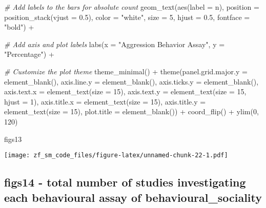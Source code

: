 \documentclass[
]{article}
\newenvironment{Shaded}{\begin{snugshade}}{\end{snugshade}}
\newcommand{\AttributeTok}[1]{\textcolor[rgb]{0.77,0.63,0.00}{#1}}
\newcommand{\CommentTok}[1]{\textcolor[rgb]{0.56,0.35,0.01}{\textit{#1}}}
\newcommand{\DecValTok}[1]{\textcolor[rgb]{0.00,0.00,0.81}{#1}}
\newcommand{\FloatTok}[1]{\textcolor[rgb]{0.00,0.00,0.81}{#1}}
\newcommand{\FunctionTok}[1]{\textcolor[rgb]{0.00,0.00,0.00}{#1}}
\newcommand{\NormalTok}[1]{#1}
\newcommand{\SpecialCharTok}[1]{\textcolor[rgb]{0.00,0.00,0.00}{#1}}
\newcommand{\StringTok}[1]{\textcolor[rgb]{0.31,0.60,0.02}{#1}}
\begin{document}
\begin{Shaded}
\begin{Highlighting}[]
  \CommentTok{\# Add labels to the bars for absolute count  }
  \FunctionTok{geom\_text}\NormalTok{(}\FunctionTok{aes}\NormalTok{(}\AttributeTok{label =}\NormalTok{ n), }\AttributeTok{position =} \FunctionTok{position\_stack}\NormalTok{(}\AttributeTok{vjust =} \FloatTok{0.5}\NormalTok{), }\AttributeTok{color =} \StringTok{"white"}\NormalTok{, }\AttributeTok{size =} \DecValTok{5}\NormalTok{, }\AttributeTok{hjust =} \FloatTok{0.5}\NormalTok{, }\AttributeTok{fontface =}   \StringTok{"bold"}\NormalTok{) }\SpecialCharTok{+}
  
  \CommentTok{\# Add axis and plot labels}
  \FunctionTok{labs}\NormalTok{(}\AttributeTok{x =} \StringTok{"Aggression Behavior Assay"}\NormalTok{, }\AttributeTok{y =} \StringTok{"Percentage"}\NormalTok{) }\SpecialCharTok{+}
  
  \CommentTok{\# Customize the plot theme}
  \FunctionTok{theme\_minimal}\NormalTok{() }\SpecialCharTok{+}
  \FunctionTok{theme}\NormalTok{(}\AttributeTok{panel.grid.major.y =} \FunctionTok{element\_blank}\NormalTok{(),}
    \AttributeTok{axis.line.y =} \FunctionTok{element\_blank}\NormalTok{(),}
    \AttributeTok{axis.ticks.y =} \FunctionTok{element\_blank}\NormalTok{(),}
    \AttributeTok{axis.text.x =} \FunctionTok{element\_text}\NormalTok{(}\AttributeTok{size =} \DecValTok{15}\NormalTok{),}
    \AttributeTok{axis.text.y =} \FunctionTok{element\_text}\NormalTok{(}\AttributeTok{size =} \DecValTok{15}\NormalTok{, }\AttributeTok{hjust =} \DecValTok{1}\NormalTok{),}
    \AttributeTok{axis.title.x =} \FunctionTok{element\_text}\NormalTok{(}\AttributeTok{size =} \DecValTok{15}\NormalTok{),}
    \AttributeTok{axis.title.y =} \FunctionTok{element\_text}\NormalTok{(}\AttributeTok{size =} \DecValTok{15}\NormalTok{),}
    \AttributeTok{plot.title =} \FunctionTok{element\_blank}\NormalTok{()) }\SpecialCharTok{+}
    \FunctionTok{coord\_flip}\NormalTok{() }\SpecialCharTok{+}
  \FunctionTok{ylim}\NormalTok{(}\DecValTok{0}\NormalTok{, }\DecValTok{120}\NormalTok{)}

\NormalTok{figs13}
\end{Highlighting}
\end{Shaded}

\texttt{[image: zf\_sm\_code\_files/figure-latex/unnamed-chunk-22-1.pdf]}

\hypertarget{figs14---total-number-of-studies-investigating-each-behavioural-assay-of-behavioural_sociality}{%
\subsection{figs14 - total number of studies investigating each
behavioural assay of
behavioural\_sociality}\label{figs14---total-number-of-studies-investigating-each-behavioural-assay-of-behavioural_sociality}}
\end{document}

